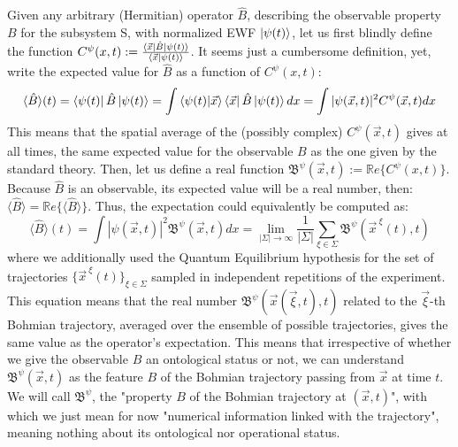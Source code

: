 \documentclass[11pt, a4paper]{article} %
\newcommand{\B}{\mathfrak{B}}
\begin{document}
Given any arbitrary (Hermitian) operator $\hat{B}$, describing the observable property $B$ for the subsystem S, with normalized EWF $\ket{\psi(t)}$, let us first blindly define the function $C^{\psi}(x,t):=\frac{\bra{\vec{x}}\hat{B}\ket{\psi(t)}}{\bra{\vec{x}}\ket{\psi(t)}}$. It seems just a cumbersome definition, yet, write the expected value for $\hat{B}$  as a function of $C^\psi(x,t)$:
\begin{equation}
\langle \hat{B}\rangle(t)= \bra{\psi(t)}\hat{B}\ket{\psi(t)}=\int \bra{\psi(t)} \ket{\vec{x}}\bra{\vec{x}}\hat{B}\ket{\psi(t)}dx =  \int |\psi(\vec{x},t)|^2C^\psi(\vec{x},t)dx
\end{equation}
This means that the spatial average of the (possibly complex) $C^\psi(\vec{x},t)$ gives at all times, the same expected value for the observable $B$ as the one given by the standard theory. Then, let us define a real function $\B^\psi(\vec{x},t):=\mathbb{R}e\{C^{\psi}(x,t)\}$. Because $\hat{B}$ is an observable, its expected value will be a real number, then: $\langle \hat{B}\rangle=\mathbb{R}e\{\langle \hat{B}\rangle\}$. Thus, the expectation could equivalently be computed as:
\begin{equation}
\langle \hat{B}\rangle(t)=\int |\psi(\vec{x},t)|^2\B^\psi(\vec{x},t)dx= \lim_{|\Sigma|\rightarrow \infty}\frac{1}{|\Sigma|} \sum_{\xi\in\Sigma} \B^\psi(\vec{x}^{\:\xi}(t),t)
\end{equation}
where we additionally used the Quantum Equilibrium hypothesis \cite{Absolute} for the set of trajectories $\{\vec{x}^{\:\xi}(t)\}_{\xi\in\Sigma}$ sampled in independent repetitions of the experiment. This equation means that the real number $\B^\psi(\vec{x}(\vec{\xi},t),t)$ related to the $\vec{\xi}$-th Bohmian trajectory, averaged over the ensemble of possible trajectories, gives the same value as the operator's expectation. This means that  irrespective of whether we give the observable $B$ an ontological status or not, we can understand $\B^\psi(\vec{x},t)$ as the feature $B$ of the Bohmian trajectory passing from $\vec{x}$ at time $t$. We will call $\B^\psi$, the "property $B$ of the Bohmian trajectory at $(\vec{x},t)$", with which we just mean for now "numerical information linked with the trajectory", meaning nothing about its ontological nor operational status.
\end{document}
